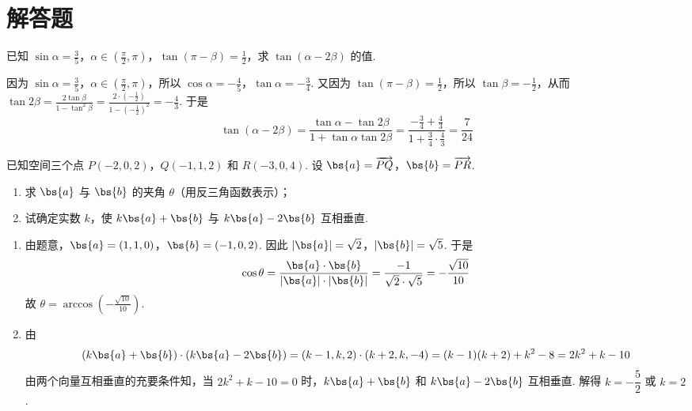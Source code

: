 \documentclass[UTF8,a4paper,oneside,11pt]{ctexbook}
\begin{document}
\section{解答题}

\begin{problem}
已知 \(\sin \alpha = \frac{3}{5}\)，\(\alpha \in \left(\frac{\pi}{2}, \pi\right)\)，\(\tan(\pi - \beta) = \frac{1}{2}\)，求 \(\tan(\alpha - 2\beta)\) 的值.
\end{problem}

\begin{solution}
因为 \(\sin \alpha = \frac{3}{5}\)，\(\alpha \in \left(\frac{\pi}{2}, \pi\right)\)，所以 \(\cos \alpha = -\frac{4}{5}\)，\(\tan \alpha = -\frac{3}{4}\).
又因为 \(\tan(\pi - \beta) = \frac{1}{2}\)，所以 \(\tan \beta = -\frac{1}{2}\)，从而
\(\tan 2\beta = \frac{2\tan \beta}{1 - \tan^2 \beta} = \frac{2 \cdot \left(-\frac{1}{2}\right)}{1 - \left(-\frac{1}{2}\right)^2} = -\frac{4}{3}\).
于是
\[
\tan(\alpha - 2\beta)
= \frac{\tan \alpha - \tan 2\beta}{1 + \tan \alpha \tan 2\beta}
= \frac{-\frac{3}{4} + \frac{4}{3}}{1 + \frac{3}{4} \cdot \frac{4}{3}}
= \frac{7}{24}
\]
\end{solution}

\begin{problem}
已知空间三个点 \(P(-2,0,2)\)，\(Q(-1,1,2)\) 和 \(R(-3,0,4)\). 设 \(\bs{a} = \overrightarrow{PQ}\)，\(\bs{b} = \overrightarrow{PR}\).

\begin{enumerate}
\item 求 \(\bs{a}\) 与 \(\bs{b}\) 的夹角 \(\theta\)（用反三角函数表示）；
\item 试确定实数 \(k\)，使 \(k\bs{a} + \bs{b}\) 与 \(k\bs{a} - 2\bs{b}\) 互相垂直.
\end{enumerate}
\end{problem}

\begin{solution}
\begin{enumerate}
\item 由题意，\(\bs{a} = (1,1,0)\)，\(\bs{b} = (-1,0,2)\).
因此 \(|\bs{a}| = \sqrt{2}\)，\(|\bs{b}| = \sqrt{5}\).
于是
\[
\cos \theta
= \frac{\bs{a} \cdot \bs{b}}{|\bs{a}| \cdot |\bs{b}|}
= \frac{-1}{\sqrt{2} \cdot \sqrt{5}}
= -\frac{\sqrt{10}}{10}
\]
故 \(\theta = \arccos\left(-\frac{\sqrt{10}}{10}\right)\).

\item 由
\[
(k\bs{a} + \bs{b}) \cdot (k\bs{a} - 2\bs{b})
    = (k - 1,k,2) \cdot (k + 2,k,-4)
    = (k - 1)(k + 2) + k^2 - 8
= 2k^2 + k - 10
\]
由两个向量互相垂直的充要条件知，当 \(2k^2 + k - 10 = 0\) 时，\(k\bs{a} + \bs{b}\) 和 \(k\bs{a} - 2\bs{b}\) 互相垂直. 解得 \(k = -\dfrac{5}{2}\) 或 \(k = 2\).
\end{enumerate}
\end{solution}
\end{document}

